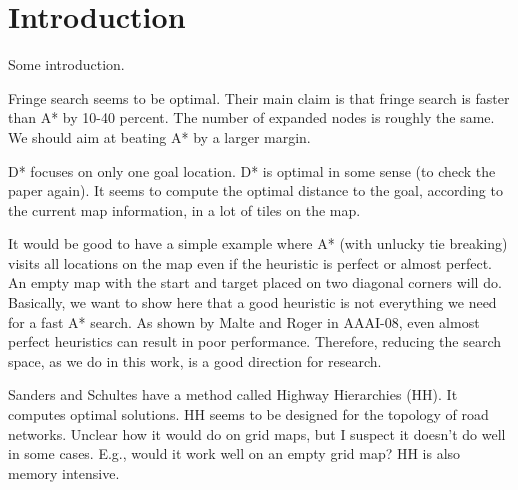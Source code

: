 
\section{Introduction}
\label{introduction}

Some introduction.

Fringe search seems to be optimal. Their main claim is that fringe search is faster than A* by 10-40 percent. The number of expanded nodes is roughly the same. We should aim at beating A* by a larger margin.

D* focuses on only one goal location. D* is optimal in some sense (to check the paper again).
It seems to compute the optimal distance to the goal, according to the current map information,
in a lot of tiles on the map.

It would be good to have a simple example where A* (with unlucky tie breaking) visits all locations on the map even if the heuristic is perfect or almost perfect. An empty map with the start and target placed on two diagonal corners will do. Basically, we want to show here that a good heuristic is not everything we need for a fast A* search. As shown by Malte and Roger in AAAI-08, even almost perfect heuristics can result in poor performance. Therefore, reducing the search space, as we do in this work, is a good direction for research.

Sanders and Schultes have a method called Highway Hierarchies (HH). It computes optimal solutions. 
HH seems to be designed for the topology of road networks. Unclear how it would do on grid maps, but I suspect it doesn't do well in some cases. E.g., would it work well on an empty grid map? HH is also memory intensive.


